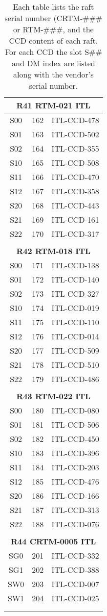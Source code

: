 \begin{longtable}{ccc}
\multicolumn{3}{c}{\bf R41  RTM-021  ITL} \\
\hline
  S00 & 162 & ITL-CCD-478 \\
  S01 & 163 & ITL-CCD-502 \\
  S02 & 164 & ITL-CCD-355 \\
  S10 & 165 & ITL-CCD-508 \\
  S11 & 166 & ITL-CCD-470 \\
  S12 & 167 & ITL-CCD-358 \\
  S20 & 168 & ITL-CCD-443 \\
  S21 & 169 & ITL-CCD-161 \\
  S22 & 170 & ITL-CCD-317 \\
 & & \\
\multicolumn{3}{c}{\bf R42  RTM-018  ITL} \\
\hline
  S00 & 171 & ITL-CCD-138 \\
  S01 & 172 & ITL-CCD-140 \\
  S02 & 173 & ITL-CCD-327 \\
  S10 & 174 & ITL-CCD-019 \\
  S11 & 175 & ITL-CCD-110 \\
  S12 & 176 & ITL-CCD-014 \\
  S20 & 177 & ITL-CCD-509 \\
  S21 & 178 & ITL-CCD-510 \\
  S22 & 179 & ITL-CCD-486 \\
 & & \\
\multicolumn{3}{c}{\bf R43  RTM-022  ITL} \\
\hline
  S00 & 180 & ITL-CCD-080 \\
  S01 & 181 & ITL-CCD-506 \\
  S02 & 182 & ITL-CCD-450 \\
  S10 & 183 & ITL-CCD-396 \\
  S11 & 184 & ITL-CCD-203 \\
  S12 & 185 & ITL-CCD-476 \\
  S20 & 186 & ITL-CCD-166 \\
  S21 & 187 & ITL-CCD-313 \\
  S22 & 188 & ITL-CCD-076 \\
 & & \\
\multicolumn{3}{c}{\bf R44  CRTM-0005  ITL} \\
\hline
  SG0 & 201 & ITL-CCD-332 \\
  SG1 & 202 & ITL-CCD-388 \\
  SW0 & 203 & ITL-CCD-007 \\
  SW1 & 204 & ITL-CCD-025 \\
 & & \\

\caption{Each table lists the raft serial number (CRTM-\#\#\# or RTM-\#\#\#, and the CCD content of each raft.  For each CCD the slot S\#\# and DM index are listed along with the vendor's serial number.}
   \label{tab:mapping}
\end{longtable}

